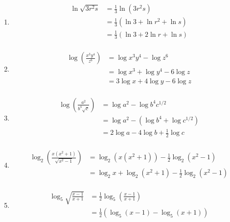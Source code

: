 \documentclass{exam}
\begin{document}
\begin{enumerate}
      \item 
        \begin{align*}
          \ln \sqrt{3 r^2 s} &= \frac{1}{3} \ln \left( 3r^2s \right) \\
                             &= \frac{1}{3} \left( \ln 3 + \ln r^2 + \ln s \right) \\
                             &= \frac{1}{3} \left( \ln 3 + 2 \ln r + \ln s \right) \\
        \end{align*}

      \item 
        \begin{align*}
          \log \left( \frac{x^3y^4}{z^6} \right) &= \log x^3y^4 - \log z^6 \\
                                                 &= \log x^3 + \log y^4 - 6 \log z \\
                                                 &= \boxed{3 \log x + 4 \log y - 6 \log z} \\
        \end{align*}

      \item 
        \begin{align*}
          \log \left( \frac{a^2}{b^4 \sqrt{c}} \right) &= \log a^2 - \log b^4 c^{1/2} \\
                                                       &= \log a^2 - \left( \log b^4 + \log c^{1/2} \right) \\
                                                       &= \boxed{2 \log a - 4 \log b + \frac{1}{2} \log c} \\
        \end{align*}

      \item 
        \begin{align*}
          \log_2 \left( \frac{x \left( x^2 + 1 \right)}{\sqrt{x^2 - 1}} \right)
            &= \log_2 \left( x \left( x^2 + 1 \right) \right) - \frac{1}{2} \log_2 \left( x^2 - 1 \right) \\
            &= \boxed{\log_2 x + \log_2 \left( x^2 + 1 \right) - \frac{1}{2} \log_2 \left( x^2 - 1 \right)} \\
        \end{align*}

      \item 
        \begin{align*}
          \log_5 \sqrt{ \frac{x - 1}{x + 1}} &= \frac{1}{2} \log_5 \left( \frac{x - 1}{x + 1} \right) \\
                                             &= \boxed{\frac{1}{2} \left( \log_5 (x - 1) - \log_5 (x + 1) \right)} \\
        \end{align*}

  \end{enumerate}
\end{document}

